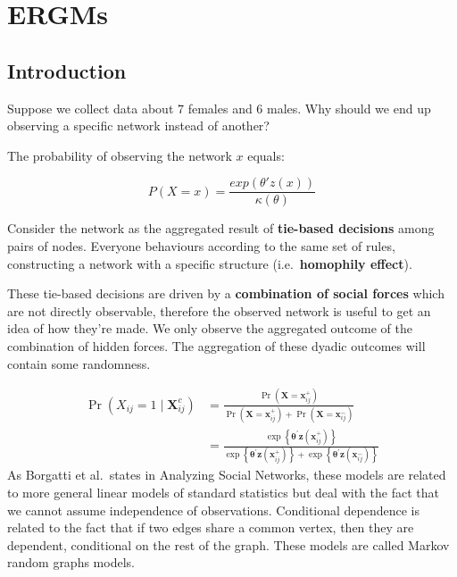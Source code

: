 \documentclass[
  notitlepage,
  onecolumn,
  openany]{book}
\begin{document}
\hypertarget{ergms}{%
\chapter{ERGMs}\label{ergms}}

\hypertarget{introduction-1}{%
\section{Introduction}\label{introduction-1}}

Suppose we collect data about \(7\) females and \(6\) males. Why should we end up observing a specific network instead of another?

The probability of observing the network \(x\) equals:

\[
P(X=x) = \frac{exp(\theta'z(x))}{\kappa(\theta)}
\]

Consider the network as the aggregated result of \textbf{tie-based decisions} among pairs of nodes. Everyone behaviours according to the same set of rules, constructing a network with a specific structure (i.e.~\textbf{homophily effect}).

These tie-based decisions are driven by a \textbf{combination of social forces} which are not directly observable, therefore the observed network is useful to get an idea of how they're made. We only observe the aggregated outcome of the combination of hidden forces. The aggregation of these dyadic outcomes will contain some randomness.

\[
\begin{aligned}
\operatorname{Pr}\left(X_{i j}=1 \mid \mathbf{X}_{i j}^{c}\right) &=\frac{\operatorname{Pr}\left(\mathbf{X}=\mathbf{x}_{i j}^{+}\right)}{\operatorname{Pr}\left(\mathbf{X}=\mathbf{x}_{i j}^{+}\right)+\operatorname{Pr}\left(\mathbf{X}=\mathbf{x}_{i j}^{-}\right)} \\&=\frac{\exp \left\{\boldsymbol{\theta}^{\prime} \mathbf{z}\left(\mathbf{x}_{i j}^{+}\right)\right\}}{\exp \left\{\boldsymbol{\theta}^{\prime} \mathbf{z}\left(\mathbf{x}_{i j}^{+}\right)\right\}+\exp \left\{\boldsymbol{\theta}^{\prime} \mathbf{z}\left(\mathbf{x}_{i j}^{-}\right)\right\}}
\end{aligned}
\]
As Borgatti et al.~states in Analyzing Social Networks, these models are related to more general linear models of standard statistics but deal with the fact that we cannot assume independence of observations. Conditional dependence is related to the fact that if two edges share a common vertex, then they are dependent, conditional on the rest of the graph. These models are called Markov random graphs models.
\end{document}
